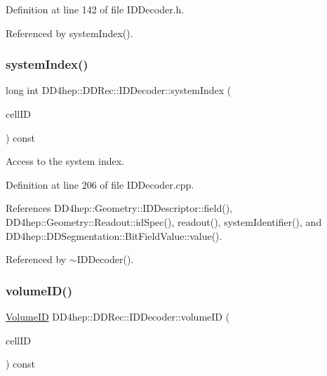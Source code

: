 Definition at line 142 of file I\+D\+Decoder.\+h.



Referenced by system\+Index().

\hypertarget{class_d_d4hep_1_1_d_d_rec_1_1_i_d_decoder_a82c02cd260a4c2b72b3647e13f557dc4}{}\label{class_d_d4hep_1_1_d_d_rec_1_1_i_d_decoder_a82c02cd260a4c2b72b3647e13f557dc4} 
\subsubsection{\texorpdfstring{system\+Index()}{systemIndex()}}
{\footnotesize\ttfamily long int D\+D4hep\+::\+D\+D\+Rec\+::\+I\+D\+Decoder\+::system\+Index (\begin{DoxyParamCaption}\item[{const \hyperlink{namespace_d_d4hep_1_1_d_d_rec_af5cecc2e566eeaedb430b92df23971d4}{Cell\+ID} \&}]{cell\+ID }\end{DoxyParamCaption}) const}



Access to the system index. 



Definition at line 206 of file I\+D\+Decoder.\+cpp.



References D\+D4hep\+::\+Geometry\+::\+I\+D\+Descriptor\+::field(), D\+D4hep\+::\+Geometry\+::\+Readout\+::id\+Spec(), readout(), system\+Identifier(), and D\+D4hep\+::\+D\+D\+Segmentation\+::\+Bit\+Field\+Value\+::value().



Referenced by $\sim$\+I\+D\+Decoder().

\hypertarget{class_d_d4hep_1_1_d_d_rec_1_1_i_d_decoder_aec5d8e981dbb6e43171ceed938f4ad1c}{}\label{class_d_d4hep_1_1_d_d_rec_1_1_i_d_decoder_aec5d8e981dbb6e43171ceed938f4ad1c} 
\subsubsection{\texorpdfstring{volume\+I\+D()}{volumeID()}\hspace{0.1cm}{\footnotesize\ttfamily [1/2]}}
{\footnotesize\ttfamily \hyperlink{namespace_d_d4hep_1_1_d_d_rec_a5b5fea15b3678944e1aba487a746bdcb}{Volume\+ID} D\+D4hep\+::\+D\+D\+Rec\+::\+I\+D\+Decoder\+::volume\+ID (\begin{DoxyParamCaption}\item[{const \hyperlink{namespace_d_d4hep_1_1_d_d_rec_af5cecc2e566eeaedb430b92df23971d4}{Cell\+ID} \&}]{cell\+ID }\end{DoxyParamCaption}) const}



